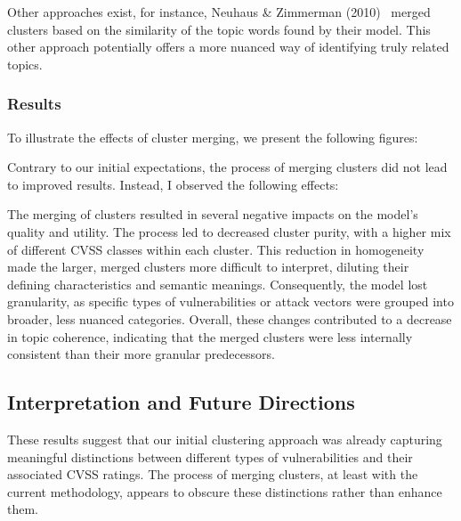 \documentclass[12pt]{article}
\begin{document}
Other approaches exist, for instance, Neuhaus \& Zimmerman
(2010)~\cite{cve_topic_modelling} merged clusters based on the similarity of the topic words found
by their model. This other approach potentially offers a more nuanced way of identifying truly related topics.

\subsubsection{Results}

To illustrate the effects of cluster merging, we present the following figures:



Contrary to our initial expectations, the process of merging clusters did not lead to improved
results. Instead, I observed the following effects:

The merging of clusters resulted in several negative impacts on the model's quality and utility. The
process led to decreased cluster purity, with a higher mix of different CVSS classes within each
cluster. This reduction in homogeneity made the larger, merged clusters more difficult to interpret,
diluting their defining characteristics and semantic meanings. Consequently, the model lost
granularity, as specific types of vulnerabilities or attack vectors were grouped into broader, less
nuanced categories. Overall, these changes contributed to a decrease in topic coherence, indicating
that the merged clusters were less internally consistent than their more granular predecessors.


\subsection{Interpretation and Future Directions}

These results suggest that our initial clustering approach was already capturing meaningful
distinctions between different types of vulnerabilities and their associated CVSS ratings. The
process of merging clusters, at least with the current methodology, appears to obscure these
distinctions rather than enhance them.
\end{document}
